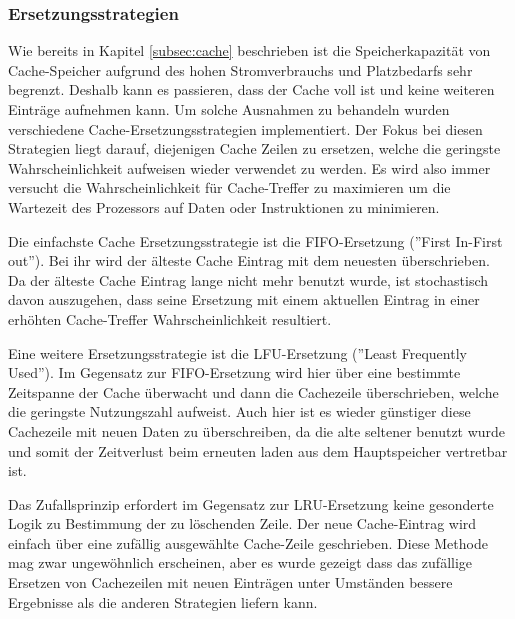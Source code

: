 \documentclass[12pt]{article}
\begin{document}
\subsubsection{Ersetzungsstrategien}
 Wie bereits in Kapitel \ref{subsec:cache} beschrieben ist die Speicherkapazität von Cache-Speicher aufgrund des hohen Stromverbrauchs und Platzbedarfs sehr begrenzt. Deshalb kann es passieren, dass der Cache voll ist und keine weiteren Einträge aufnehmen kann. Um solche Ausnahmen zu behandeln wurden verschiedene Cache-Ersetzungsstrategien implementiert. Der Fokus bei diesen Strategien liegt darauf, diejenigen Cache Zeilen zu ersetzen, welche die geringste Wahrscheinlichkeit aufweisen wieder verwendet zu werden. Es wird also immer versucht die Wahrscheinlichkeit für Cache-Treffer zu maximieren um die Wartezeit des Prozessors auf Daten oder Instruktionen zu minimieren. \cite{mikroprozessortechnik2011}


\noindent Die einfachste Cache Ersetzungsstrategie ist die FIFO-Ersetzung (''First In-First out''). Bei ihr wird der älteste Cache Eintrag mit dem neuesten überschrieben. Da der älteste Cache Eintrag lange nicht mehr benutzt wurde, ist stochastisch davon auszugehen, dass seine Ersetzung mit einem aktuellen Eintrag in einer erhöhten Cache-Treffer Wahrscheinlichkeit resultiert.

\noindent Eine weitere Ersetzungsstrategie ist die LFU-Ersetzung (''Least Frequently Used''). Im Gegensatz zur FIFO-Ersetzung wird hier über eine bestimmte Zeitspanne der Cache überwacht und dann die Cachezeile überschrieben, welche die geringste Nutzungszahl aufweist. Auch hier ist es wieder günstiger diese Cachezeile mit neuen Daten zu überschreiben, da die alte seltener benutzt wurde und somit der Zeitverlust beim erneuten laden aus dem Hauptspeicher vertretbar ist.

\noindent Das Zufallsprinzip erfordert im Gegensatz zur LRU-Ersetzung keine gesonderte Logik zu Bestimmung der zu löschenden Zeile. Der neue Cache-Eintrag wird einfach über eine zufällig ausgewählte Cache-Zeile geschrieben. Diese Methode mag zwar ungewöhnlich erscheinen, aber es wurde gezeigt dass das zufällige Ersetzen von Cachezeilen mit neuen Einträgen unter Umständen bessere Ergebnisse als die anderen Strategien liefern kann.\cite[S.185ff]{mikroprozessortechnik2011} \cite{smith1985instruction}

\end{document}
